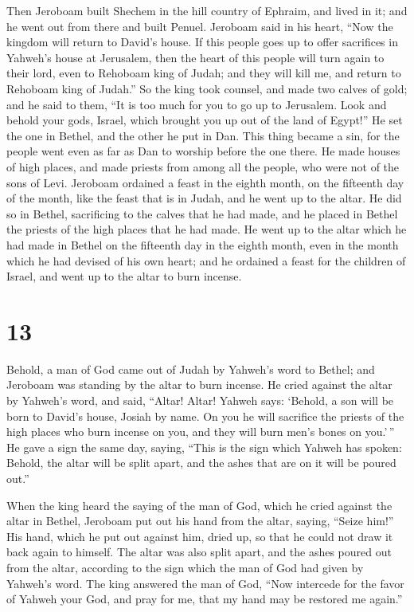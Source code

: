  Then Jeroboam built Shechem in the hill country of
Ephraim, and lived in it; and he went out from there and built Penuel.
 Jeroboam said in his heart, ``Now the kingdom will return
to David's house.  If this people goes up to offer
sacrifices in Yahweh's house at Jerusalem, then the heart of this people
will turn again to their lord, even to Rehoboam king of Judah; and they
will kill me, and return to Rehoboam king of Judah.''  So
the king took counsel, and made two calves of gold; and he said to them,
``It is too much for you to go up to Jerusalem. Look and behold your
gods, Israel, which brought you up out of the land of Egypt!''
 He set the one in Bethel, and the other he put in Dan.
 This thing became a sin, for the people went even as far
as Dan to worship before the one there.  He made houses of
high places, and made priests from among all the people, who were not of
the sons of Levi.  Jeroboam ordained a feast in the eighth
month, on the fifteenth day of the month, like the feast that is in
Judah, and he went up to the altar. He did so in Bethel, sacrificing to
the calves that he had made, and he placed in Bethel the priests of the
high places that he had made.  He went up to the altar
which he had made in Bethel on the fifteenth day in the eighth month,
even in the month which he had devised of his own heart; and he ordained
a feast for the children of Israel, and went up to the altar to burn
incense.

\hypertarget{section-12}{%
\section{13}\label{section-12}}

 Behold, a man of God came out of Judah by Yahweh's word to
Bethel; and Jeroboam was standing by the altar to burn incense.
 He cried against the altar by Yahweh's word, and said,
``Altar! Altar! Yahweh says: `Behold, a son will be born to David's
house, Josiah by name. On you he will sacrifice the priests of the high
places who burn incense on you, and they will burn men's bones on
you.'\,''  He gave a sign the same day, saying, ``This is
the sign which Yahweh has spoken: Behold, the altar will be split apart,
and the ashes that are on it will be poured out.''

 When the king heard the saying of the man of God, which he
cried against the altar in Bethel, Jeroboam put out his hand from the
altar, saying, ``Seize him!'' His hand, which he put out against him,
dried up, so that he could not draw it back again to himself.
 The altar was also split apart, and the ashes poured out
from the altar, according to the sign which the man of God had given by
Yahweh's word.  The king answered the man of God, ``Now
intercede for the favor of Yahweh your God, and pray for me, that my
hand may be restored me again.''

